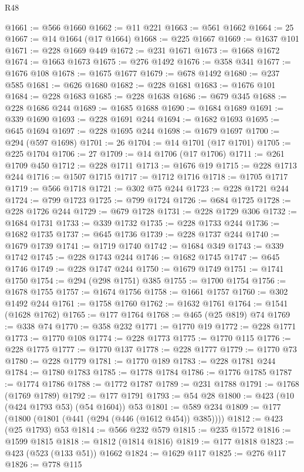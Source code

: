 \begin{lexlean}{R48}
\begin{coremodule}
@1661 := @566 @1660
@1662 := @11 @221
@1663 := @561 @1662
@1664 := 25
@1667 := @14 @1664 (@17 @1664)
@1668 := @225 @1667
@1669 := @1637 @101
@1671 := @228 @1669 @449
@1672 := @231 @1671
@1673 := @1668 @1672
@1674 := @1663 @1673
@1675 := @276 @1492
@1676 := @358 @341
@1677 := @1676 @108
@1678 := @1675 @1677
@1679 := @678 @1492
@1680 := @237 @585
@1681 := @626 @1680
@1682 := @228 @1681
@1683 := @1676 @101
@1684 := @228 @1683
@1685 := @228 @1638
@1686 := @679 @345
@1688 := @228 @1686 @244
@1689 := @1685 @1688
@1690 := @1684 @1689
@1691 := @339 @1690
@1693 := @228 @1691 @244
@1694 := @1682 @1693
@1695 := @645 @1694
@1697 := @228 @1695 @244
@1698 := @1679 @1697
@1700 := @294 (@597 @1698)
@1701 := 26
@1704 := @14 @1701 (@17 @1701)
@1705 := @225 @1704
@1706 := 27
@1709 := @14 @1706 (@17 @1706)
@1711 := @261 @1709 @450
@1712 := @228 @1711
@1713 := @1676 @19
@1715 := @228 @1713 @244
@1716 := @1507 @1715
@1717 := @1712 @1716
@1718 := @1705 @1717
@1719 := @566 @1718
@1721 := @302 @75 @244
@1723 := @228 @1721 @244
@1724 := @799 @1723
@1725 := @799 @1724
@1726 := @684 @1725
@1728 := @228 @1726 @244
@1729 := @679 @1728
@1731 := @228 @1729 @306
@1732 := @1684 @1731
@1733 := @339 @1732
@1735 := @228 @1733 @244
@1736 := @1682 @1735
@1737 := @645 @1736
@1739 := @228 @1737 @244
@1740 := @1679 @1739
@1741 := @1719 @1740
@1742 := @1684 @349
@1743 := @339 @1742
@1745 := @228 @1743 @244
@1746 := @1682 @1745
@1747 := @645 @1746
@1749 := @228 @1747 @244
@1750 := @1679 @1749
@1751 := @1741 @1750
@1754 := @294 (@298 @1751) @385
@1755 := @1700 @1754
@1756 := @1678 @1755
@1757 := @1674 @1756
@1758 := @1661 @1757
@1760 := @302 @1492 @244
@1761 := @1758 @1760
@1762 := @1632 @1761
@1764 := @1541 (@1628 @1762)
@1765 := @177 @1764
@1768 := @465 (@25 @819) @74
@1769 := @338 @74
@1770 := @358 @232
@1771 := @1770 @19
@1772 := @228 @1771
@1773 := @1770 @108
@1774 := @228 @1773
@1775 := @1770 @115
@1776 := @228 @1775
@1777 := @1770 @137
@1778 := @228 @1777
@1779 := @1770 @73
@1780 := @228 @1779
@1781 := @1770 @189
@1783 := @228 @1781 @244
@1784 := @1780 @1783
@1785 := @1778 @1784
@1786 := @1776 @1785
@1787 := @1774 @1786
@1788 := @1772 @1787
@1789 := @231 @1788
@1791 := @1768 (@1769 @1789)
@1792 := @177 @1791
@1793 := @54 @28
@1800 := @423 (@10 (@424 @1793 @53) (@54 @1604)) @53
@1801 := @589 @234
@1809 := @177 (@1800 (@1801 (@441 (@294 (@446 (@1612 @454)) @385))))
@1812 := @423 (@25 @1793) @53
@1814 := @566 @232 @579
@1815 := @235 @1572
@1816 := @1599 @1815
@1818 := @1812 (@1814 @1816)
@1819 := @177 @1818
@1823 := @423 (@523 (@133 @51)) @1662
@1824 := @1629 @117
@1825 := @276 @117
@1826 := @778 @115

\end{coremodule}
\end{lexlean}
